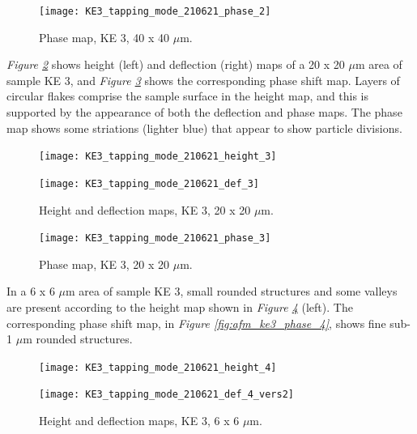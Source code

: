 \begin{figure}[H]
\centering
  \texttt{[image: KE3\_tapping\_mode\_210621\_phase\_2]}
\caption[Phase map, KE 3]{Phase map, KE 3, 40 x 40 $\mu$m.}
\label{fig:afm_ke3_phase_2}
\end{figure}

\textit{Figure \ref{fig:afm_ke3_height_def_3}} shows height (left) and deflection (right) maps of a 20 x 20 $\mu$m area of sample KE 3, and \textit{Figure \ref{fig:afm_ke3_phase_3}} shows the corresponding phase shift map. Layers of circular flakes comprise the sample surface in the height map, and this is supported by the appearance of both the deflection and phase maps. The phase map shows some striations (lighter blue) that appear to show particle divisions.


\begin{figure}[H]
\centering
\begin{minipage}{.45\textwidth}
  \centering
  \texttt{[image: KE3\_tapping\_mode\_210621\_height\_3]}
\end{minipage}
\begin{minipage}{.45\textwidth}
  \centering
  \texttt{[image: KE3\_tapping\_mode\_210621\_def\_3]}
\end{minipage}
\caption[Height and deflection maps, KE 3]{Height and deflection maps, KE 3, 20 x 20 $\mu$m.}
\label{fig:afm_ke3_height_def_3}
\end{figure}

\begin{figure}[H]
\centering
  \texttt{[image: KE3\_tapping\_mode\_210621\_phase\_3]}
\caption[Phase map, KE 3]{Phase map, KE 3, 20 x 20 $\mu$m.}
\label{fig:afm_ke3_phase_3}
\end{figure}

In a 6 x 6 $\mu$m area of sample KE 3, small rounded structures and some valleys are present according to the height map shown in \textit{Figure \ref{fig:afm_ke3_height_def_4}} (left). The corresponding phase shift map, in \textit{Figure \ref{fig:afm_ke3_phase_4}}, shows fine sub-1 $\mu$m rounded structures.

\begin{figure}[H]
\centering
\begin{minipage}{.45\textwidth}
  \centering
  \texttt{[image: KE3\_tapping\_mode\_210621\_height\_4]}
\end{minipage}
\begin{minipage}{.45\textwidth}
  \centering
  \texttt{[image: KE3\_tapping\_mode\_210621\_def\_4\_vers2]}
\end{minipage}
\caption[Height and deflection maps, KE 3]{Height and deflection maps, KE 3, 6 x 6 $\mu$m.}
\label{fig:afm_ke3_height_def_4}
\end{figure}

